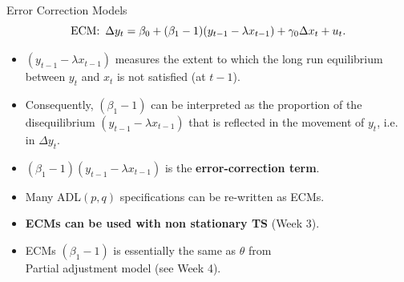 \documentclass[usenames,dvipsnames]{beamer}
\begin{document}
\begin{frame}{Error Correction Models}
\begin{equation*} 
\textnormal{ECM:} \, \, \, \Delta y_t = \beta_0 + (\beta_1 -1) ( y_{t-1} - \lambda x_{t-1} ) + 
         \gamma_0 \Delta x_t + u_t.
\end{equation*}

\begin{itemize}
\item $( y_{t-1} - \lambda x_{t-1} )$ measures the extent to which the long run equilibrium between $y_t$ and $x_t$ is not satisfied (at $t-1$).
\item Consequently, $(\beta_1 -1)$ can be interpreted as the proportion of the disequilibrium $( y_{t-1} - \lambda x_{t-1} )$ that is reflected in the movement of $y_t$, i.e. in $\Delta y_t$.
\item $(\beta_1 -1)( y_{t-1} - \lambda x_{t-1} )$ is the \textbf{error-correction term}.
\item Many ADL$(p,q)$ specifications can be re-written as ECMs.
\item \textbf{ECMs can be used with non stationary TS} (Week 3).
\item ECMs $(\beta_1 -1)$ is essentially the same as $\theta$ from \\Partial adjustment model (see Week 4).
\end{itemize}


\end{frame}
\end{document}
